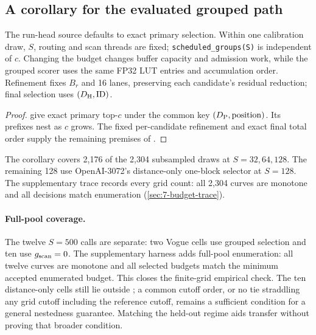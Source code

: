 \subsection{A corollary for the evaluated grouped path}

The run-head source defaults to exact primary selection. Within one
calibration draw, $S$, routing and scan threads are fixed;
\texttt{scheduled\_groups(S)} is independent of $c$. Changing the budget
changes buffer capacity and admission work, while the grouped scorer
uses the same FP32 LUT entries and accumulation order. Refinement fixes
$B_r$ and 16 lanes, preserving each candidate's residual reduction;
final selection uses $(D_{\mathrm{H}},\mathrm{ID})$.

\par\noindent\begin{minipage}{\linewidth}
\begin{proof}
 give exact
primary top-$c$ under the common key $(D_{\mathrm{P}},\mathrm{position})$.
Its prefixes nest as $c$ grows. The fixed per-candidate refinement and
exact final total order supply the remaining premises of
.
\end{proof}
\end{minipage}\par\medskip

The corollary covers 2,176 of the 2,304 subsampled draws at
$S=32,64,128$. The remaining 128 use OpenAI-3072's distance-only
one-block selector at $S=128$. The supplementary trace records every
grid count: all 2,304 curves are monotone and all decisions match
enumeration (\cref{sec:7-budget-trace}).

\paragraph{Full-pool coverage.}
The twelve $S=500$ calls are separate: two Vogue cells use grouped
selection and ten use $g_{\mathrm{scan}}=0$. The supplementary harness adds full-pool
enumeration: all twelve curves are monotone and all selected budgets
match the minimum accepted enumerated budget. This closes the finite-grid
empirical check. The ten distance-only cells still lie outside
; a common cutoff order, or no tie
straddling any grid cutoff including the reference cutoff, remains a
sufficient condition for a general nestedness guarantee. Matching the
held-out regime aids transfer without proving that broader condition.

